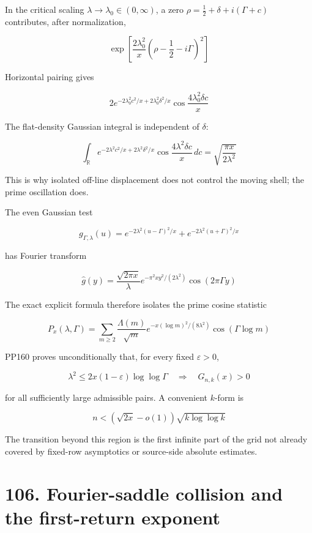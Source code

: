 \documentclass[
  11pt,
]{book}
\begin{document}
In the critical scaling \(\lambda\to\lambda_0\in(0,\infty)\), a zero
\(\rho=\tfrac12+\delta+i(\Gamma+c)\) contributes, after normalization,

\[
\exp\!\left[
\frac{2\lambda_0^2}{x}
\left(\rho-\frac12-i\Gamma\right)^2
\right]
\tag{105.4}
\]

Horizontal pairing gives

\[
2e^{-2\lambda_0^2c^2/x+2\lambda_0^2\delta^2/x}
\cos\frac{4\lambda_0^2\delta c}{x}
\tag{105.5}
\]

The flat-density Gaussian integral is independent of \(\delta\):

\[
\int_{\mathbb R}
e^{-2\lambda^2c^2/x+2\lambda^2\delta^2/x}
\cos\frac{4\lambda^2\delta c}{x}\,dc
=\sqrt{\frac{\pi x}{2\lambda^2}}
\tag{105.6}
\]

This is why isolated off-line displacement does not control the moving
shell; the prime oscillation does.

The even Gaussian test

\[
g_{\Gamma,\lambda}(u)
=e^{-2\lambda^2(u-\Gamma)^2/x}
+e^{-2\lambda^2(u+\Gamma)^2/x}
\tag{105.7}
\]

has Fourier transform

\[
\widehat g(y)
=\frac{\sqrt{2\pi x}}{\lambda}
e^{-\pi^2xy^2/(2\lambda^2)}
\cos(2\pi\Gamma y)
\tag{105.8}
\]

The exact explicit formula therefore isolates the prime cosine statistic

\[
P_x(\lambda,\Gamma)
=\sum_{m\ge2}
\frac{\Lambda(m)}{\sqrt m}
e^{-x(\log m)^2/(8\lambda^2)}
\cos(\Gamma\log m)
\tag{105.9}
\]

PP160 proves unconditionally that, for every fixed \(\varepsilon>0\),

\[
\lambda^2
\le2x(1-\varepsilon)\log\log\Gamma
\quad\Longrightarrow\quad
G_{n,k}(x)>0
\tag{105.10}
\]

for all sufficiently large admissible pairs. A convenient \(k\)-form is

\[
n<(\sqrt{2x}-o(1))\sqrt{k\log\log k}
\tag{105.11}
\]

The transition beyond this region is the first infinite part of the grid
not already covered by fixed-row asymptotics or source-side absolute
estimates.

\section{106. Fourier-saddle collision and the first-return
exponent}\label{fourier-saddle-collision-and-the-first-return-exponent}
\end{document}
